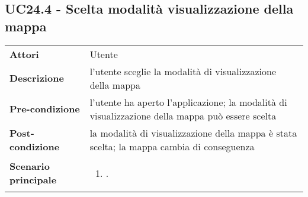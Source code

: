 \subsection{UC24.4 - Scelta modalità visualizzazione della mappa} 
\label{sssec:UC24.4} 
\def\arraystretch{1.5}
\begin{tabularx}{\textwidth}{l|p{}}
	\rowcolor{I} \multicolumn{2}{c}{\color{white}\textbf{UC24.4 - Scelta modalità visualizzazione della mappa}} \\
	\toprule
	\endhead
	\textbf{Attori} & Utente\\
	\textbf{Descrizione} & l'utente sceglie la modalità di visualizzazione della mappa\\
	\textbf{Pre-condizione} & l'utente ha aperto l'applicazione; la modalità di visualizzazione della mappa può essere scelta\\
	\textbf{Post-condizione} & la modalità di visualizzazione della mappa è stata scelta; la mappa cambia di conseguenza\\
	\textbf{Scenario principale} & \vspace{-1.2em}\begin{enumerate}[leftmargin=*,noitemsep,nosep]
		\item \nameref{sssec:UC24.4}.
	\end{enumerate}\\
	\bottomrule
\end{tabularx}
